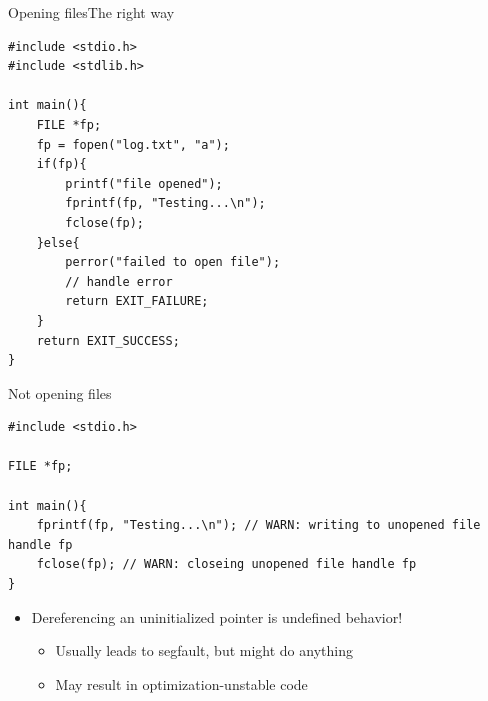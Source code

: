 \documentclass{beamer}
\begin{document}
\begin{frame}[fragile]{Opening files}{The right way}
\begin{lstlisting}
#include <stdio.h>
#include <stdlib.h>

int main(){
    FILE *fp;
    fp = fopen("log.txt", "a");
    if(fp){
        printf("file opened");
        fprintf(fp, "Testing...\n");
        fclose(fp);
    }else{
        perror("failed to open file");
        // handle error
        return EXIT_FAILURE;
    }
    return EXIT_SUCCESS;
}
\end{lstlisting}
\end{frame}

\begin{frame}[fragile]{Not opening files}
\begin{lstlisting}
#include <stdio.h>

FILE *fp;

int main(){
    fprintf(fp, "Testing...\n"); // WARN: writing to unopened file handle fp
    fclose(fp); // WARN: closeing unopened file handle fp
}
\end{lstlisting}
\begin{itemize}
\item Dereferencing an uninitialized pointer is undefined behavior!
	\begin{itemize}
	\item Usually leads to segfault, but might do anything
	\item May result in optimization-unstable code
	\end{itemize}
\end{itemize}
\end{frame}

%
\end{document}
